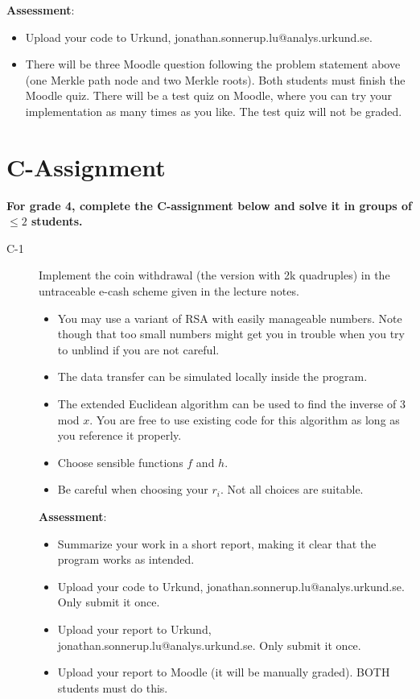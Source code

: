 \documentclass{article}
\begin{document}
\begin{description}
		\textbf{Assessment}:
		\begin{itemize}
			\item Upload your code to Urkund, jonathan.sonnerup.lu@analys.urkund.se.
			\item There will be three Moodle question following the problem statement above (one Merkle path node and two Merkle roots). Both students must finish the Moodle quiz.	There will be a test quiz on Moodle, where you can try your implementation as many times as you like. The test quiz will not be graded.
		\end{itemize}
		
		
	\end{description}
	
	\clearpage
	
	\section*{C-Assignment}
	\textbf{For grade 4, complete the C-assignment below and solve it in groups of $\leq 2$ students.}
	
	\begin{description}
		\item[C-1]{Implement the coin withdrawal (the version with 2k quadruples) in the untraceable e-cash
			scheme given in the lecture notes.
			\begin{itemize}
				\item You may use a variant of RSA with easily manageable numbers. Note though that too small numbers might get you in trouble when you try to unblind if you are not careful.
				\item The data transfer can be simulated locally inside the program.
				\item The extended Euclidean algorithm can be used to find the inverse of 3 mod $x$. You are free to use existing code for this algorithm as long as you reference it properly.
				\item Choose sensible functions $f$ and $h$.
				\item Be careful when choosing your $r_i$. Not all choices are suitable.
			\end{itemize}
			
			\textbf{Assessment}:
			\begin{itemize}
				\item Summarize your work in a short report, making it clear that the program works as intended.
				\item Upload your code to Urkund, jonathan.sonnerup.lu@analys.urkund.se. Only submit it once.
				\item Upload your report to Urkund, jonathan.sonnerup.lu@analys.urkund.se. Only submit it once.
				\item Upload your report to Moodle (it will be manually graded). BOTH students must do this.
			\end{itemize}
		}
	\end{description}
\end{document}
